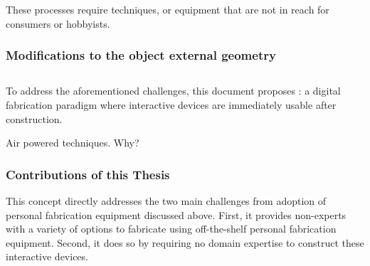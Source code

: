           These processes require techniques, or equipment that are not in reach
          for consumers or hobbyists.

        \subsubsection*{Modifications to the object external geometry}
      
    \subsection{\papf}
      To address the aforementioned challenges, this document proposes \papf:
      a digital fabrication paradigm where interactive devices are
      immediately usable after construction.

        Air powered techniques. Why?

      \subsubsection*{Contributions of this Thesis}
        This concept directly addresses the two main challenges from adoption of
        personal fabrication equipment discussed above. First, it provides
        non-experts with a variety of options to fabricate using off-the-shelf
        personal fabrication equipment. Second, it does so by requiring no domain
        expertise to construct these interactive devices.

